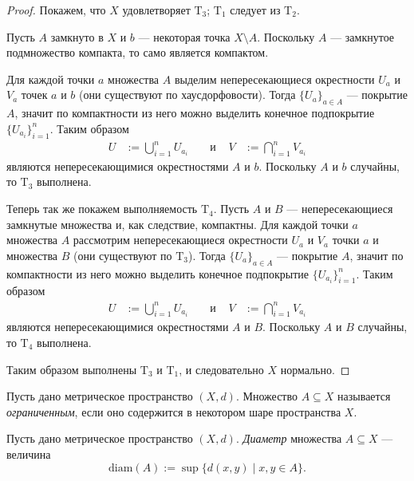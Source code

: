 \documentclass[12pt,a4paper]{article}
\newcommand{\diam}{\ensuremath{\mathrm{diam}}\xspace}
\newcommand{\T}{\ensuremath{\mathrm{T}}\xspace}
\begin{document}
    \begin{proof}
        Покажем, что $X$ удовлетворяет $\T_3$; $\T_1$ следует из $\T_2$.
        
        Пусть $A$ замкнуто в $X$ и $b$ --- некоторая точка $X \setminus A$. Поскольку $A$ --- замкнутое подмножество компакта, то само является компактом.

        Для каждой точки $a$ множества $A$ выделим непересекающиеся окрестности $U_a$ и $V_a$ точек $a$ и $b$ (они существуют по хаусдорфовости). Тогда $\{U_a\}_{a \in A}$ --- покрытие $A$, значит по компактности из него можно выделить конечное подпокрытие $\{U_{a_i}\}_{i=1}^n$. Таким образом
        \begin{align*}
            U &:= \bigcup_{i=1}^n U_{a_i}&
            &\text{ и }&
            V &:= \bigcap_{i=1}^n V_{a_i}
        \end{align*}
        являются непересекающимися окрестностями $A$ и $b$. Поскольку $A$ и $b$ случайны, то $\T_3$ выполнена.

        Теперь так же покажем выполняемость $\T_4$. Пусть $A$ и $B$ --- непересекающиеся замкнутые множества и, как следствие, компактны. Для каждой точки $a$ множества $A$ рассмотрим непересекающиеся окрестности $U_a$ и $V_a$ точки $a$ и множества $B$ (они существуют по $\T_3$). Тогда $\{U_a\}_{a \in A}$ --- покрытие $A$, значит по компактности из него можно выделить конечное подпокрытие $\{U_{a_i}\}_{i=1}^n$. Таким образом
        \begin{align*}
            U &:= \bigcup_{i=1}^n U_{a_i}&
            &\text{ и }&
            V &:= \bigcap_{i=1}^n V_{a_i}
        \end{align*}
        являются непересекающимися окрестностями $A$ и $B$. Поскольку $A$ и $B$ случайны, то $\T_4$ выполнена.

        Таким образом выполнены $\T_3$ и $\T_1$, и следовательно $X$ нормально.
    \end{proof}

    \begin{definition}
        Пусть дано метрическое пространство $(X, d)$. Множество $A \subseteq X$ называется \emph{ограниченным}, если оно содержится в некотором шаре пространства $X$.
    \end{definition}

    \begin{definition}
        Пусть дано метрическое пространство $(X, d)$. \emph{Диаметр} множества $A \subseteq X$ --- величина
        \[\diam(A) := \sup \{d(x,y) \mid x, y \in A\}.\]
    \end{definition}
\end{document}
